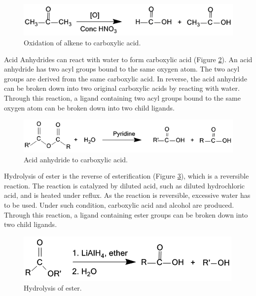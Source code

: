 \begin{figure}
\begin{center}
\includegraphics[width=\linewidth]{../isyn/AlkeneOxidation.png}
\end{center}
\caption{Oxidation of alkene to carboxylic acid.}
\label{fig:AlkeneOxidation}
\end{figure}

Acid Anhydrides can react with water to form carboxylic acid (Figure \ref{fig:AcidAnhydride}). An acid anhydride has two acyl groups bound to the same oxygen atom. The two acyl groups are derived from the same carboxylic acid. In reverse, the acid anhydride can be broken down into two original carboxylic acids by reacting with water. Through this reaction, a ligand containing two acyl groups bound to the same oxygen atom can be broken down into two child ligands.
 
\begin{figure}
\begin{center}
\includegraphics[width=\linewidth]{../isyn/AcidAnhydride.png}
\end{center}
\caption{Acid anhydride to carboxylic acid.}
\label{fig:AcidAnhydride}
\end{figure}

Hydrolysis of ester is the reverse of esterification (Figure \ref{fig:EsterHydrolysis}), which is a reversible reaction. The reaction is catalyzed by diluted acid, such as diluted hydrochloric acid, and is heated under reflux. As the reaction is reversible, excessive water has to be used. Under such condition, carboxylic acid and alcohol are produced. Through this reaction, a ligand containing ester groups can be broken down into two child ligands.

\begin{figure}
\begin{center}
\includegraphics[width=\linewidth]{../isyn/EsterHydrolysis.png}
\end{center}
\caption{Hydrolysis of ester.}
\label{fig:EsterHydrolysis}
\end{figure}

